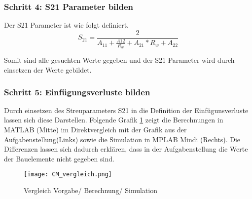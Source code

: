 \subsubsection{Schritt 4: S21 Parameter bilden}\label{subsubsec:schritt4}
Der S21 Parameter ist wie folgt definiert.
\begin{equation}\label{equ:def_s21_aparams}
S_{21} = \frac{2}{A_{11}+\frac{A{12}}{R_w}+A_{21}*R_w+A_{22}}
\end{equation}

Somit sind alle gesuchten Werte gegeben und der S21 Parameter wird durch einsetzen der Werte gebildet.

\subsubsection{Schritt 5: Einfügungsverluste bilden}\label{subsubsec:schritt5}
Durch einsetzen des Streuparameters S21 in die Definition der Einfügunsverluste lassen sich diese Darstellen. Folgende Grafik \ref{fig:Vergleich Berechnung Simulation} zeigt die Berechnungen in MATLAB (Mitte) im Direktvergleich mit der Grafik aus der Aufgabenstellung(Links) sowie die Simulation in MPLAB Mindi (Rechts). Die Differenzen lassen sich dadurch erklären, dass in der Aufgabenstellung die Werte der Bauelemente nicht gegeben sind.
\begin{figure}[H]
	\centering
	\texttt{[image: CM\_vergleich.png]}
	\caption{Vergleich Vorgabe/ Berechnung/ Simulation}
	\label{fig:Vergleich Berechnung Simulation}
\end{figure}
